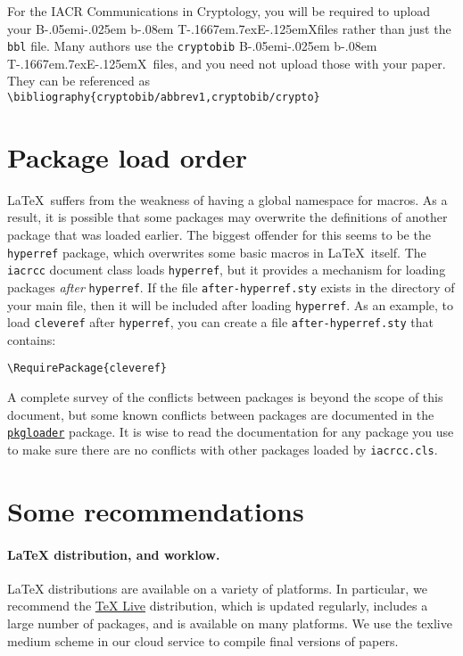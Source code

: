 \documentclass{iacrcc}
\def\BibTeX{{\rm B\kern-.05em{\sc i\kern-.025em b}\kern-.08em
    T\kern-.1667em\lower.7ex\hbox{E}\kern-.125emX}}
\begin{document}
For the IACR Communications in Cryptology, you will be required to
upload your \BibTeX files rather than just the \texttt{bbl} file.
Many authors use the \texttt{cryptobib} \BibTeX\ files, and you need
not upload those with your paper. They can be referenced as
\texttt{\textbackslash bibliography\{cryptobib/abbrev1,cryptobib/crypto\}}

\section{Package load order}\label{sec:loadorder}

\LaTeX\ suffers from the weakness of having a global namespace for
macros. As a result, it is possible that some packages may overwrite
the definitions of another package that was loaded earlier. The
biggest offender for this seems to be the \texttt{hyperref} package,
which overwrites some basic macros in \LaTeX\ itself. The
\texttt{iacrcc} document class loads \texttt{hyperref}, but it
provides a mechanism for loading packages \emph{after} \texttt{hyperref}. If
the file \texttt{after-hyperref.sty} exists in the directory of your
main file, then it will be included after loading \texttt{hyperref}.
As an example, to load \texttt{cleveref} after \texttt{hyperref}, you
can create a file \texttt{after-hyperref.sty} that contains:
\begin{verbatim}
\RequirePackage{cleveref}
\end{verbatim}
A complete survey of the conflicts between packages is beyond the scope of this document, but
some known conflicts between packages are documented in the
\href{https://github.com/mhelvens/latex-pkgloader/blob/master/pkgloader-recommended.sty}{\texttt{pkgloader}}
package. It is wise to read the documentation for any package you use to make sure
there are no conflicts with other packages loaded by \texttt{iacrcc.cls}.

\section{Some recommendations}\label{sec:options}

\paragraph{\LaTeX{} distribution, and worklow.}  \LaTeX{}
distributions are available on a variety of platforms.  In particular,
we recommend the \href{https://www.tug.org/texlive/}{TeX Live}
distribution, which is updated regularly, includes a large number of
packages, and is available on many platforms. We use the texlive medium
scheme in our cloud service to compile final versions of papers.
\end{document}
